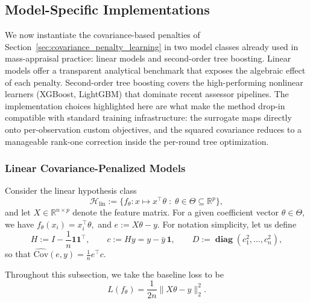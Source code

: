 \documentclass{article}
\theoremstyle{plain}
\theoremstyle{definition}
\newcommand{\R}{\mathbb{R}}
\newcommand{\1}{\mathbf{1}}
\newcommand{\Cov}{\text{Cov}}
\renewcommand{\H}{\mathcal{H}}
\renewcommand{\R}{\mathbb{R}}
\newcommand{\diag}{\mathbf{\operatorname{diag}}}
\begin{document}

\subsection{Model-Specific Implementations}
\label{sec:model_specific_implementations}

We now instantiate the covariance-based penalties of Section~\ref{sec:covariance_penalty_learning} in two model classes already used in mass-appraisal practice: linear models and second-order tree boosting. Linear models offer a transparent analytical benchmark that exposes the algebraic effect of each penalty. Second-order tree boosting covers the high-performing nonlinear learners (XGBoost, LightGBM) that dominate recent assessor pipelines. The implementation choices highlighted here are what make the method drop-in compatible with standard training infrastructure: the surrogate maps directly onto per-observation custom objectives, and the squared covariance reduces to a manageable rank-one correction inside the per-round tree optimization.


\subsubsection{Linear Covariance-Penalized Models}
\label{subsec:linear_models}

Consider the linear hypothesis class
\[
\H_{\mathrm{lin}} := \{f_\theta : x \mapsto x^\top \theta \;:\; \theta \in \Theta \subseteq \R^p\},
\]
and let $X \in \R^{n\times p}$ denote the feature matrix. For a given coefficient vector $\theta \in \Theta$, we have
$
f_\theta(x_i) = x_i^\top \theta,
$ and $
e := X\theta - y.
$ 
For notation simplicity, let us define
\[
H := I - \frac{1}{n}\mathbf{1}\mathbf{1}^\top,
\qquad
c := Hy = y - \bar y\,\mathbf{1},
\qquad
D := \diag(c_1^2,\dots,c_n^2),
\]
so that
$
\widehat{\Cov}(e,y)
=
\frac{1}{n}e^\top c.
$ 

Throughout this subsection, we take the baseline loss to be
\[
L(f_\theta) = \frac{1}{2n}\|X\theta-y\|_2^2.
\]
\end{document}
